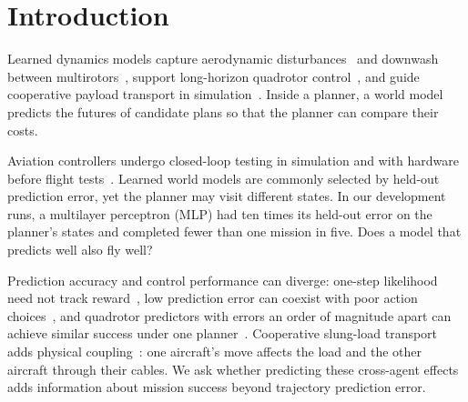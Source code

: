 \documentclass[conference]{IEEEtran}
\begin{document}
\section{Introduction}\label{sec:intro}

Learned dynamics models capture aerodynamic disturbances~\cite{oconnell2022neuralfly} and downwash between multirotors~\cite{shi2020neuralswarm,shi2021neuralswarm2}, support long-horizon quadrotor control~\cite{rao2026skyjepa}, and guide cooperative payload transport in simulation~\cite{khursheed2024cooperative}. Inside a planner, a world model predicts the futures of candidate plans so that the planner can compare their costs.

Aviation controllers undergo closed-loop testing in simulation and with hardware before flight tests~\cite{jung2007hil,belcastro2012validation}. Learned world models are commonly selected by held-out prediction error, yet the planner may visit different states. In our development runs, a multilayer perceptron (MLP) had ten times its held-out error on the planner's states and completed fewer than one mission in five. Does a model that predicts well also fly well?

Prediction accuracy and control performance can diverge: one-step likelihood need not track reward~\cite{lambert2020objective}, low prediction error can coexist with poor action choices~\cite{qiu2026adwm,liu2026predictionfidelity}, and quadrotor predictors with errors an order of magnitude apart can achieve similar success under one planner~\cite{min2026same}. Cooperative slung-load transport adds physical coupling~\cite{lee2014geometric,wahba2024kinodynamic,sun2025agile,lorentz2026crazymarl}: one aircraft's move affects the load and the other aircraft through their cables. We ask whether predicting these cross-agent effects adds information about mission success beyond trajectory prediction error.
\end{document}
